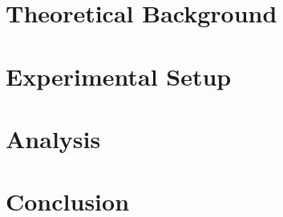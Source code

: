\documentclass[a4paper,10pt]{article}
\begin{document}
\section{Theoretical Background}

\section{Experimental Setup}

\section{Analysis}


\section{Conclusion}


\begin{thebibliography}{99}

\end{thebibliography}
\end{document}
